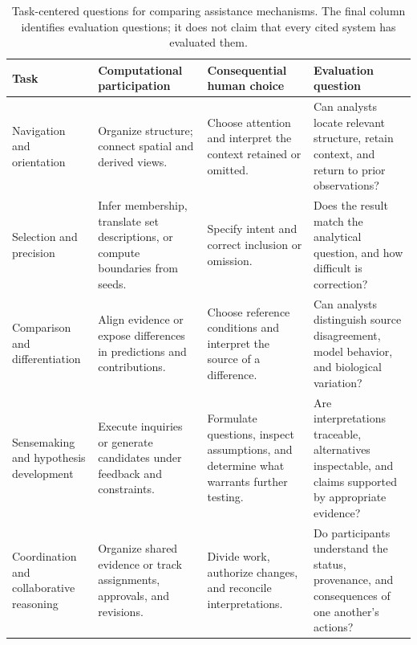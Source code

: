 \begin{table}[t]
\centering
\caption{Task-centered questions for comparing assistance mechanisms. The final column identifies evaluation questions; it does not claim that every cited system has evaluated them.}
\label{tab:task-agency-synthesis}
\small
\setlength{\tabcolsep}{4pt}
\renewcommand{\arraystretch}{1.15}
\begin{tabularx}{\textwidth}{@{}>{\raggedright\arraybackslash}p{}>{\raggedright\arraybackslash}X >{\raggedright\arraybackslash}X >{\raggedright\arraybackslash}X@{}}
\toprule
Task & Computational participation & Consequential human choice & Evaluation question \\
\midrule
Navigation and orientation & Organize structure; connect spatial and derived views. & Choose attention and interpret the context retained or omitted. & Can analysts locate relevant structure, retain context, and return to prior observations? \\
Selection and precision & Infer membership, translate set descriptions, or compute boundaries from seeds. & Specify intent and correct inclusion or omission. & Does the result match the analytical question, and how difficult is correction? \\
Comparison and differentiation & Align evidence or expose differences in predictions and contributions. & Choose reference conditions and interpret the source of a difference. & Can analysts distinguish source disagreement, model behavior, and biological variation? \\
Sensemaking and hypothesis development & Execute inquiries or generate candidates under feedback and constraints. & Formulate questions, inspect assumptions, and determine what warrants further testing. & Are interpretations traceable, alternatives inspectable, and claims supported by appropriate evidence? \\
Coordination and collaborative reasoning & Organize shared evidence or track assignments, approvals, and revisions. & Divide work, authorize changes, and reconcile interpretations. & Do participants understand the status, provenance, and consequences of one another's actions? \\
\bottomrule
\end{tabularx}
\end{table}
